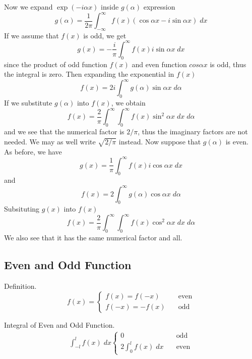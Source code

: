 \documentclass[../../../main.tex]{subfiles}
\begin{document}
Now we expand $\exp (-i\alpha x)$ inside $g(\alpha)$ expression
\begin{equation*}
    g(\alpha)=\frac{1}{2\pi}\int_{-\infty}^{\infty}f(x)(\cos \alpha x-i\sin \alpha x)\;dx
\end{equation*}
If we assume that $f(x)$ is odd, we get
\begin{equation*}
    g(x)=-\frac{i}{\pi}\int_{0}^{\infty}f(x)i\sin \alpha x\;dx
\end{equation*}
since the product of odd function $f(x)$ and even function $cos \alpha x$ is odd, thus the integral is zero. Then expanding the exponential in $f(x)$
\begin{equation*}
    f(x)=2i\int_{0}^{\infty}g(\alpha)\sin \alpha x\; d\alpha
\end{equation*}
If we substitute $g(\alpha)$ into $f(x)$, we obtain
\begin{equation*}
    f(x)=\frac{2}{\pi}\int_{0}^{\infty}\int_{0}^{\infty}f(x)\sin^2 \alpha x\;dx\; d\alpha
\end{equation*}
and we see that the numerical factor is $2/\pi$, thus the imaginary factors are not needed. We may as well write $\sqrt{2/\pi}$ instead. Now suppose that $g(\alpha)$ is even. As before, we have
\begin{equation*}
    g(x)=\frac{1}{\pi}\int_{0}^{\infty}f(x)i\cos \alpha x\;dx
\end{equation*}
and
\begin{equation*}
    f(x)=2\int_{0}^{\infty}g(\alpha)\cos \alpha x\; d\alpha
\end{equation*}
Subsituting $g(x)$ into $f(x)$
\begin{equation*}
    f(x)=\frac{2}{\pi}\int_{0}^{\infty}\int_{0}^{\infty}f(x)\cos^2 \alpha x\;dx\; d\alpha
\end{equation*}
We also see that it has the same numerical factor and all.

\subsection{Even and Odd Function}
Definition.
\begin{equation*}
    f(x)=
    \begin{cases}
        f(x)=f(-x)\quad  & \text{even} \\
        f(-x)=-f(x)\quad & \text{odd}
    \end{cases}
\end{equation*}

Integral of Even and Odd Function.
\begin{align*}
    \int_{-l}^{l}   f(x)\;dx
    \begin{cases}
        0\quad                                       & \text{odd}  \\
        2  \displaystyle\int_{0}^{l}   f(x)\;dx\quad & \text{even}
    \end{cases}
\end{align*}
\end{document}
